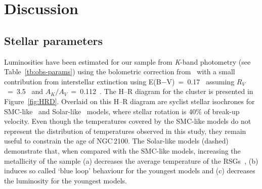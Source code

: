 \documentclass[useAMS,usenatbib]{mn2e}
\begin{document}

\section{Discussion} %
\label{sec:discussion}

\subsection{Stellar parameters} %
\label{sub:stellar_parameters_disc}

Luminosities have been estimated for our sample from {\it K}-band photometry (see Table~\ref{tb:obs-params}) using the bolometric correction from~\cite{2013ApJ...767....3D} with a small contribution from interstellar extinction using E(B$-$V)~=~0.17~\citep{2015A&A...575A..62N} assuming $R_V$~=~3.5~\citep{2013A&A...558A.134D} and $A_K/A_V$~=~0.112~\citep{1985ApJ...288..618R}.
The H--R diagram for the cluster is presented in Figure~\ref{fig:HRD}.
Overlaid on this H--R diagram are {\sc syclist} stellar isochrones for SMC-like~\citep[solid lines;][]{2013A&A...558A.103G} and Solar-like~\citep[dashed lines;][]{2012A&A...537A.146E} models, where stellar rotation is 40\% of break-up velocity.
Even though the temperatures covered by the SMC-like models do not represent the distribution of temperatures observed in this study, they remain useful to constrain the age of NGC\,2100.
The Solar-like models (dashed) demonstrate that, when compared with the SMC-like models, increasing the metallicity of the sample
(a) decreases the average temperature of the RSGs~\citep[something which is not observed by][]{2015ApJ...803...14P},
(b) induces so called `blue loop' behaviour for the youngest models and
(c) decreases the luminosity for the youngest models.

\end{document}
